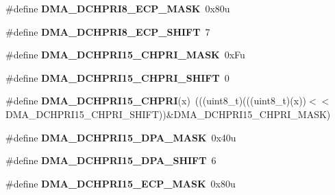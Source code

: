 \begin{DoxyCompactItemize}
\item 
\#define {\bfseries D\+M\+A\+\_\+\+D\+C\+H\+P\+R\+I8\+\_\+\+E\+C\+P\+\_\+\+M\+A\+SK}~0x80u\hypertarget{group__DMA__Register__Masks_ga853ddcde9ef1ca6dcdb2a5742bb4c081}{}\label{group__DMA__Register__Masks_ga853ddcde9ef1ca6dcdb2a5742bb4c081}

\item 
\#define {\bfseries D\+M\+A\+\_\+\+D\+C\+H\+P\+R\+I8\+\_\+\+E\+C\+P\+\_\+\+S\+H\+I\+FT}~7\hypertarget{group__DMA__Register__Masks_ga0717f20f481144abf2d14c7d9c67e289}{}\label{group__DMA__Register__Masks_ga0717f20f481144abf2d14c7d9c67e289}

\item 
\#define {\bfseries D\+M\+A\+\_\+\+D\+C\+H\+P\+R\+I15\+\_\+\+C\+H\+P\+R\+I\+\_\+\+M\+A\+SK}~0x\+Fu\hypertarget{group__DMA__Register__Masks_ga9dff6549497c3518454e82bb9f5c88a9}{}\label{group__DMA__Register__Masks_ga9dff6549497c3518454e82bb9f5c88a9}

\item 
\#define {\bfseries D\+M\+A\+\_\+\+D\+C\+H\+P\+R\+I15\+\_\+\+C\+H\+P\+R\+I\+\_\+\+S\+H\+I\+FT}~0\hypertarget{group__DMA__Register__Masks_ga5e81f55c9806dcfa91352c763197b4cd}{}\label{group__DMA__Register__Masks_ga5e81f55c9806dcfa91352c763197b4cd}

\item 
\#define {\bfseries D\+M\+A\+\_\+\+D\+C\+H\+P\+R\+I15\+\_\+\+C\+H\+P\+RI}(x)~(((uint8\+\_\+t)(((uint8\+\_\+t)(x))$<$$<$D\+M\+A\+\_\+\+D\+C\+H\+P\+R\+I15\+\_\+\+C\+H\+P\+R\+I\+\_\+\+S\+H\+I\+FT))\&D\+M\+A\+\_\+\+D\+C\+H\+P\+R\+I15\+\_\+\+C\+H\+P\+R\+I\+\_\+\+M\+A\+SK)\hypertarget{group__DMA__Register__Masks_ga6deef7b34df8edee0b7ad30775cefbbe}{}\label{group__DMA__Register__Masks_ga6deef7b34df8edee0b7ad30775cefbbe}

\item 
\#define {\bfseries D\+M\+A\+\_\+\+D\+C\+H\+P\+R\+I15\+\_\+\+D\+P\+A\+\_\+\+M\+A\+SK}~0x40u\hypertarget{group__DMA__Register__Masks_ga3b39c6e0610362d59e6ff055e29f0192}{}\label{group__DMA__Register__Masks_ga3b39c6e0610362d59e6ff055e29f0192}

\item 
\#define {\bfseries D\+M\+A\+\_\+\+D\+C\+H\+P\+R\+I15\+\_\+\+D\+P\+A\+\_\+\+S\+H\+I\+FT}~6\hypertarget{group__DMA__Register__Masks_gad352f5ccc0fe19ea638ea2430ccc3afb}{}\label{group__DMA__Register__Masks_gad352f5ccc0fe19ea638ea2430ccc3afb}

\item 
\#define {\bfseries D\+M\+A\+\_\+\+D\+C\+H\+P\+R\+I15\+\_\+\+E\+C\+P\+\_\+\+M\+A\+SK}~0x80u\hypertarget{group__DMA__Register__Masks_ga61fa9d2c60ec0993ecf63e1a3ed62e79}{}\label{group__DMA__Register__Masks_ga61fa9d2c60ec0993ecf63e1a3ed62e79}


\end{DoxyCompactItemize}
